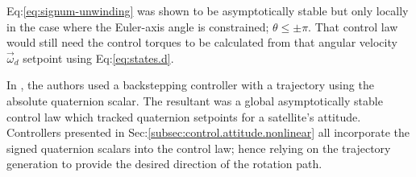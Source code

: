 Eq:\ref{eq:signum-unwinding} was shown to be asymptotically stable but only locally in the case where the Euler-axis angle is constrained; $\theta\leq \pm\pi$. That control law  would still need the control torques to be calculated from that angular velocity $\vec{\omega}_d$ setpoint using Eq:\ref{eq:states.d}.
\par
In \cite{intelligentbackstep}, the authors used a backstepping controller with a trajectory using the absolute quaternion scalar. The resultant was a global asymptotically stable control law which tracked quaternion setpoints for a satellite's attitude. Controllers presented in Sec:\ref{subsec:control.attitude.nonlinear} all incorporate the signed quaternion scalars into the control law;  hence relying on the trajectory generation to provide the desired direction of the rotation path.
\newpage
